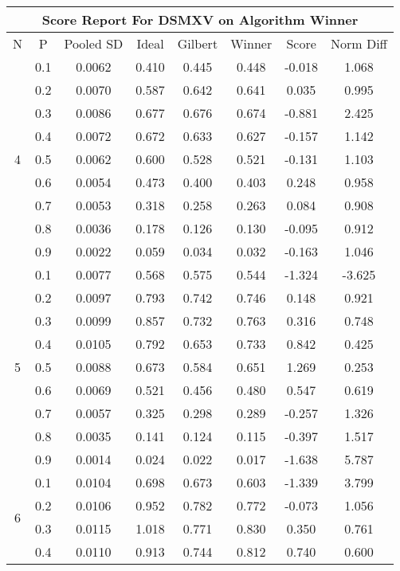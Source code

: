\documentclass[11pt,a4paper]{report}
\begin{document}
\begin{longtable}{ | c | c || c | c | c | c | c | c | }
\hline
\multicolumn{8}{|c|}{ Score Report For DSMXV on Algorithm Winner} \\
\hline
N & P & Pooled SD &  Ideal &  Gilbert & Winner  & Score & Norm Diff \\
 \hline
 \hline
 \endhead
\multirow{9}{*}{4} & 0.1 & 0.0062 & 0.410 & 0.445 & 0.448 & -0.018 & 1.068 \\
 & 0.2 & 0.0070 & 0.587 & 0.642 & 0.641 & 0.035 & 0.995 \\
 & 0.3 & 0.0086 & 0.677 & 0.676 & 0.674 & -0.881 & 2.425 \\
 & 0.4 & 0.0072 & 0.672 & 0.633 & 0.627 & -0.157 & 1.142 \\
 & 0.5 & 0.0062 & 0.600 & 0.528 & 0.521 & -0.131 & 1.103 \\
 & 0.6 & 0.0054 & 0.473 & 0.400 & 0.403 & 0.248 & 0.958 \\
 & 0.7 & 0.0053 & 0.318 & 0.258 & 0.263 & 0.084 & 0.908 \\
 & 0.8 & 0.0036 & 0.178 & 0.126 & 0.130 & -0.095 & 0.912 \\
 & 0.9 & 0.0022 & 0.059 & 0.034 & 0.032 & -0.163 & 1.046 \\
 \hline
\multirow{9}{*}{5} & 0.1 & 0.0077 & 0.568 & 0.575 & 0.544 & -1.324 & -3.625 \\
 & 0.2 & 0.0097 & 0.793 & 0.742 & 0.746 & 0.148 & 0.921 \\
 & 0.3 & 0.0099 & 0.857 & 0.732 & 0.763 & 0.316 & 0.748 \\
 & 0.4 & 0.0105 & 0.792 & 0.653 & 0.733 & 0.842 & 0.425 \\
 & 0.5 & 0.0088 & 0.673 & 0.584 & 0.651 & 1.269 & 0.253 \\
 & 0.6 & 0.0069 & 0.521 & 0.456 & 0.480 & 0.547 & 0.619 \\
 & 0.7 & 0.0057 & 0.325 & 0.298 & 0.289 & -0.257 & 1.326 \\
 & 0.8 & 0.0035 & 0.141 & 0.124 & 0.115 & -0.397 & 1.517 \\
 & 0.9 & 0.0014 & 0.024 & 0.022 & 0.017 & -1.638 & 5.787 \\
 \hline
\multirow{9}{*}{6} & 0.1 & 0.0104 & 0.698 & 0.673 & 0.603 & -1.339 & 3.799 \\
 & 0.2 & 0.0106 & 0.952 & 0.782 & 0.772 & -0.073 & 1.056 \\
 & 0.3 & 0.0115 & 1.018 & 0.771 & 0.830 & 0.350 & 0.761 \\
 & 0.4 & 0.0110 & 0.913 & 0.744 & 0.812 & 0.740 & 0.600 \\

\end{longtable}
\end{document}
